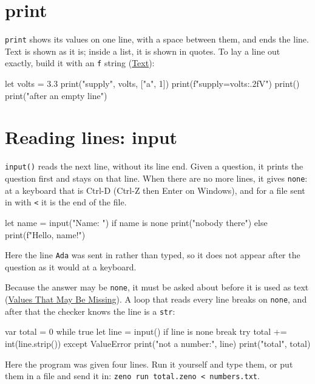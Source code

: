 \section{print}

\verb|print| shows its values on one line, with a space between them,
and ends the line. Text is shown as it is; inside a list, it is shown
in quotes. To lay a line out exactly, build it with an \verb|f| string
(\hyperref[ch-text]{Text}):

\begin{zeno}
let volts = 3.3
print("supply", volts, ["a", 1])
print(f"supply={volts:.2f}V")
print()
print("after an empty line")
\end{zeno}

\section{Reading lines: input}

\verb|input()| reads the next line, without its line end. Given a
question, it prints the question first and stays on that line. When
there are no more lines, it gives \verb|none|: at a keyboard that is
Ctrl-D (Ctrl-Z then Enter on Windows), and for a file sent in with
\verb|<| it is the end of the file.

\begin{zeno}[stdin=Ada\n]
let name = input("Name: ")
if name is none {
    print("nobody there")
} else {
    print(f"Hello, {name}!")
}
\end{zeno}

Here the line \verb|Ada| was sent in rather than typed, so it does
not appear after the question as it would at a keyboard.

Because the answer may be \verb|none|, it must be asked about before it
is used as text (\hyperref[ch-none]{Values That May Be Missing}). A
loop that reads every line breaks on \verb|none|, and after that the
checker knows the line is a \verb|str|:

\begin{zeno}[stdin=12\n7\nfast\n30\n]
var total = 0
while true {
    let line = input()
    if line is none {
        break
    }
    try {
        total += int(line.strip())
    } except ValueError {
        print("not a number:", line)
    }
}
print("total", total)
\end{zeno}

Here the program was given four lines. Run it yourself and type them,
or put them in a file and send it in: \verb|zeno run total.zeno < numbers.txt|.

